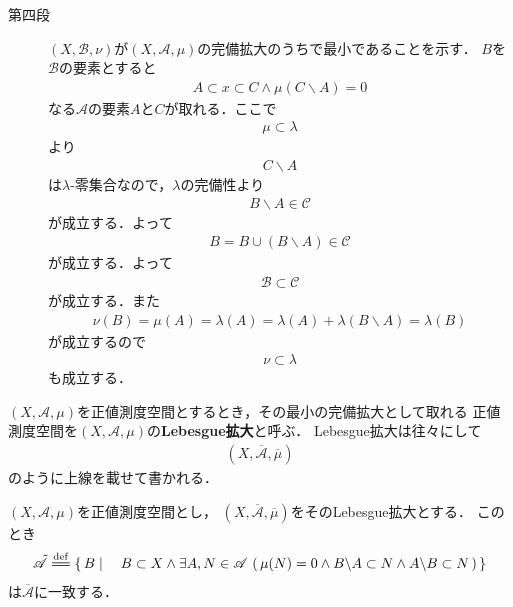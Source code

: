 \begin{sketch}
\begin{description}
				\item[第四段]	$(X,\mathscr{B},\nu)$が$(X,\mathscr{A},\mu)$の完備拡大のうちで最小であることを示す．
					$B$を$\mathscr{B}$の要素とすると
					\begin{align}
						A \subset x \subset C \wedge \mu(C \backslash A)=0
					\end{align}
					なる$\mathscr{A}$の要素$A$と$C$が取れる．ここで
					\begin{align}
						\mu \subset \lambda
					\end{align}
					より
					\begin{align}
						C \backslash A
					\end{align}
					は$\lambda$-零集合なので，$\lambda$の完備性より
					\begin{align}
						B \backslash A \in \mathscr{C}
					\end{align}
					が成立する．よって
					\begin{align}
						B = B \cup (B \backslash A) \in \mathscr{C}
					\end{align}
					が成立する．よって
					\begin{align}
						\mathscr{B} \subset \mathscr{C}
					\end{align}
					が成立する．また
					\begin{align}
						\nu(B) = \mu(A) = \lambda(A) = \lambda(A) + \lambda(B \backslash A) = \lambda(B)
					\end{align}
					が成立するので
					\begin{align}
						\nu \subset \lambda
					\end{align}
					も成立する．
					\QED
			\end{description}
		\end{sketch}
		
		\begin{screen}
			\begin{dfn}[Lebesgue拡大]
				$(X,\mathscr{A},\mu)$を正値測度空間とするとき，その最小の完備拡大として取れる
				正値測度空間を$(X,\mathscr{A},\mu)$の{\bf Lebesgue拡大}と呼ぶ．
				Lebesgue拡大は往々にして
				\begin{align}
					\left( X,\overline{\mathscr{A}},\overline{\mu} \right)
				\end{align}
				のように上線を載せて書かれる．
			\end{dfn}
		\end{screen}
		
		\begin{screen}
			\begin{thm}[Lebesgue拡大の可測集合族の対称差による表現]
				$(X,\mathscr{A},\mu)$を正値測度空間とし，
				$\left( X,\overline{\mathscr{A}},\overline{\mu} \right)$をそのLebesgue拡大とする．
				このとき
				\begin{align}
					\tilde{\mathscr{A}} \defeq \Set{B}{B \subset X \wedge \exists A,N \in \mathscr{A}\, 
					\left(\, \mu(N) = 0 \wedge B \backslash A \subset N \wedge
					A \backslash B \subset N\, \right)}
				\end{align}
				は$\overline{\mathscr{A}}$に一致する．
			\end{thm}
		\end{screen}
		
